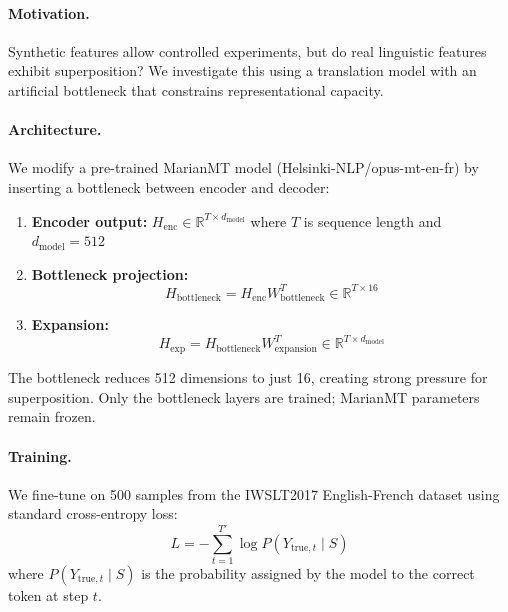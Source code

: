 \paragraph{Motivation.} Synthetic features allow controlled experiments, but do real linguistic features exhibit superposition? We investigate this using a translation model with an artificial bottleneck that constrains representational capacity.

\paragraph{Architecture.} We modify a pre-trained MarianMT model (Helsinki-NLP/opus-mt-en-fr) by inserting a bottleneck between encoder and decoder:

\begin{enumerate}
    \item \textbf{Encoder output:} $H_{\text{enc}} \in \mathbb{R}^{T \times d_{\text{model}}}$ where $T$ is sequence length and $d_{\text{model}} = 512$
    
    \item \textbf{Bottleneck projection:} 
    \begin{equation}
    H_{\text{bottleneck}} = H_{\text{enc}} W_{\text{bottleneck}}^T \in \mathbb{R}^{T \times 16}
    \end{equation}
    
    \item \textbf{Expansion:} 
    \begin{equation}
    H_{\text{exp}} = H_{\text{bottleneck}} W_{\text{expansion}}^T \in \mathbb{R}^{T \times d_{\text{model}}}
    \end{equation}
\end{enumerate}

The bottleneck reduces 512 dimensions to just 16, creating strong pressure for superposition. Only the bottleneck layers are trained; MarianMT parameters remain frozen.

\paragraph{Training.} We fine-tune on 500 samples from the IWSLT2017 English-French dataset \citep{cettolo2017overview} using standard cross-entropy loss:
\begin{equation}
L = -\sum_{t=1}^{T'} \log P(Y_{\text{true},t} \mid S)
\end{equation}
where $P(Y_{\text{true},t} \mid S)$ is the probability assigned by the model to the correct token at step $t$.

